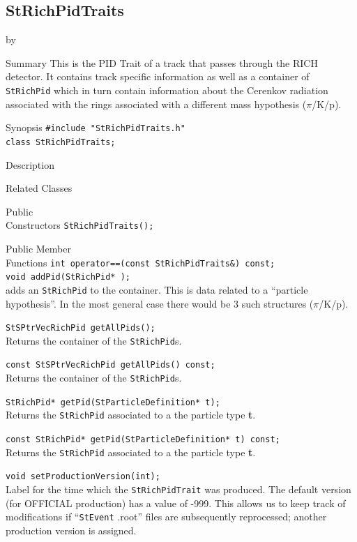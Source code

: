 \documentclass[twoside]{article}
\newcommand{\entrylabel}[1]{\mbox{\textbf{{#1}}}\hfil}%
\newenvironment{entry}
{\begin{list}{}%
    {\renewcommand{\makelabel}{\entrylabel}%
     \setlength{\labelwidth}{90pt}%
     \setlength{\leftmargin}{\labelwidth}
     \advance\leftmargin by \labelsep%
      }%
    }%
  {\end{list}}
\newcommand{\Entrylabel}[1]%
{\raisebox{0pt}[1ex][0pt]{\makebox[\labelwidth][l]%
    {\parbox[t]{\labelwidth}{\hspace{0pt}\textbf{{#1}}}}}}
\newenvironment{Entry}%
{\renewcommand{\entrylabel}{\Entrylabel}\begin{entry}}%
  {\end{entry}}
\begin{document}
\subsection{StRichPidTraits}
\label{sec:StRichPidTraits}
\begin{Entry}
\item[Summary] This is the PID Trait of a track that
    passes through the RICH detector.  It contains
    track specific information as well as a
    container of \texttt{StRichPid} which in
    turn contain information about the Cerenkov
    radiation associated with the rings associated
    with a different mass hypothesis ($\pi$/K/p).
\item[Synopsis]
    \verb+#include "StRichPidTraits.h"+\\
    \verb+class StRichPidTraits;+\\
\item[Description]
\item[Related Classes]
\item[Public\\ Constructors]
    \verb+StRichPidTraits();+\\
\item[Public Member\\ Functions]
    \verb+int operator==(const StRichPidTraits&) const;+\\
    \verb+void addPid(StRichPid* );+\\
    adds an \texttt{StRichPid} to the container.
    This is data related to a ``particle hypothesis''.
    In the most general case there would be 3 such
    structures ($\pi$/K/p).
    
    \verb+StSPtrVecRichPid getAllPids();+\\
    Returns the container of the \texttt{StRichPid}s.
    
    \verb+const StSPtrVecRichPid getAllPids() const;+\\
    Returns the container of the \texttt{StRichPid}s.

    \verb+StRichPid* getPid(StParticleDefinition* t);+\\
    Returns the \texttt{StRichPid} associated to a
    the particle type {\bf t}.
    
    \verb+const StRichPid* getPid(StParticleDefinition* t) const;+\\
    Returns the \texttt{StRichPid} associated to a
    the particle type {\bf t}.

    \verb+void setProductionVersion(int);+\\
    Label for the time which the \texttt{StRichPidTrait}
    was produced.  The default version (for OFFICIAL production)
    has a value of -999.  This allows us to keep track of
    modifications if ``\texttt{StEvent} .root'' files are
    subsequently reprocessed; another production version
    is assigned.
    

\end{Entry}
\end{document}
